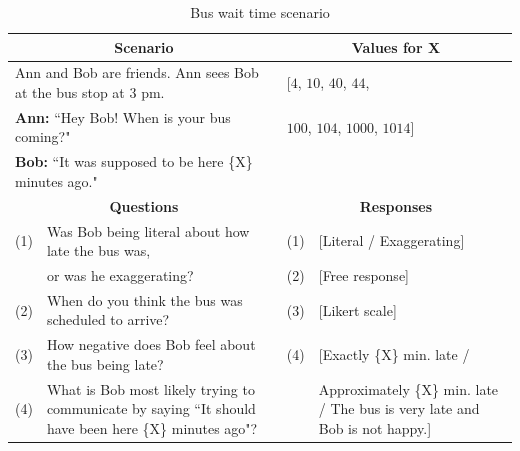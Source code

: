 \documentclass{article} %
\begin{document}
\begin{table}[h]
\begin{tabular}{| p{0.15cm}  p{8.15cm}| p{0.15cm}p{4cm} |}\hline
\multicolumn{2}{|c|}{\textbf{Scenario}} & \multicolumn{2}{c|}{\textbf{Values for X}} \\\hline
\multicolumn{2}{|l|}{Ann and Bob are friends. Ann sees Bob at the bus stop at 3 pm.} & \multicolumn{2}{l|}{[$4$, $10$, $40$, $44$,}\\
\multicolumn{2}{|l|}{\textbf{Ann:} ``Hey Bob! When is your bus coming?"} & \multicolumn{2}{l|}{$100$, $104$, $1000$, $1014$]}\\
\multicolumn{2}{|l|}{\textbf{Bob:} ``It was supposed to be here \{X\} minutes ago."} & \multicolumn{2}{l|}{}\\\hline
\multicolumn{2}{|c|}{\textbf{Questions}} & \multicolumn{2}{c|}{\textbf{Responses}} \\\hline
(1) & Was Bob being literal about how late the bus was, & (1) &[Literal / Exaggerating] \\
 & or was he exaggerating? & (2) & [Free response] \\
(2) & When do you think the bus was scheduled to arrive? & (3) & [Likert scale] \\
(3) & How negative does Bob feel about the bus being late? & (4) & [Exactly \{X\} min. late / \\
(4) & What is Bob most likely trying to communicate by saying  ``It should have been here \{X\} minutes ago"? & & Approximately \{X\} min. late / The bus is very late and Bob is not happy.]\\\hline
\end{tabular}
\caption{Bus wait time scenario}
\label{tab:bustable}
\end{table}
\end{document}

